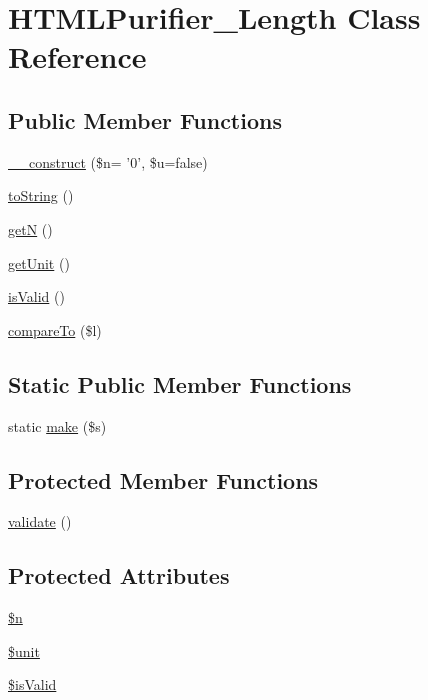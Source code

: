\hypertarget{classHTMLPurifier__Length}{\section{H\+T\+M\+L\+Purifier\+\_\+\+Length Class Reference}
\label{classHTMLPurifier__Length}
}
\subsection*{Public Member Functions}
\begin{DoxyCompactItemize}
\item 
\hyperlink{classHTMLPurifier__Length_a5e2f90515b5224003be7fa2d6fb4f813}{\+\_\+\+\_\+construct} (\$n= '0', \$u=false)
\item 
\hyperlink{classHTMLPurifier__Length_ae872c17bf1c1d58508ebd5eacb6df220}{to\+String} ()
\item 
\hyperlink{classHTMLPurifier__Length_a925aad235966d9f9decc412a771c176f}{get\+N} ()
\item 
\hyperlink{classHTMLPurifier__Length_a801e4f86f35648bc4166536b6763d150}{get\+Unit} ()
\item 
\hyperlink{classHTMLPurifier__Length_aef739ccc01785ff683e1563aa0367297}{is\+Valid} ()
\item 
\hyperlink{classHTMLPurifier__Length_a7e95d358d66a53fdd4ac5d9477f29388}{compare\+To} (\$l)
\end{DoxyCompactItemize}
\subsection*{Static Public Member Functions}
\begin{DoxyCompactItemize}
\item 
static \hyperlink{classHTMLPurifier__Length_a6a042789c0c99ef92066bd69e3f91ce0}{make} (\$s)
\end{DoxyCompactItemize}
\subsection*{Protected Member Functions}
\begin{DoxyCompactItemize}
\item 
\hyperlink{classHTMLPurifier__Length_a0dc753e7de3a549edc202958f23e41c3}{validate} ()
\end{DoxyCompactItemize}
\subsection*{Protected Attributes}
\begin{DoxyCompactItemize}
\item 
\hyperlink{classHTMLPurifier__Length_ae5e0e6ba1ea8bf13163fd1926c583e43}{\$n}
\item 
\hyperlink{classHTMLPurifier__Length_a770d1e622fc661387ade708fa9308a89}{\$unit}
\item 
\hyperlink{classHTMLPurifier__Length_a702c647145c9f859423b269f98fbe2e0}{\$is\+Valid}
\end{DoxyCompactItemize}
